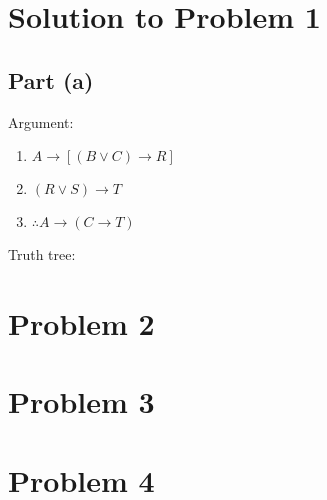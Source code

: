 \documentclass[12pt]{article}
\begin{document}
\section*{Solution to Problem 1}

\subsection*{Part (a)}

Argument: 
\begin{enumerate}
    \item $A \rightarrow [ (B \lor C) \rightarrow R]$
    \item $(R \lor S) \rightarrow T$
    \item $\therefore A \rightarrow (C \rightarrow T)$
\end{enumerate}

Truth tree: 

%
%

\section*{Problem 2}


\section*{Problem 3}


\section*{Problem 4}
\end{document}
